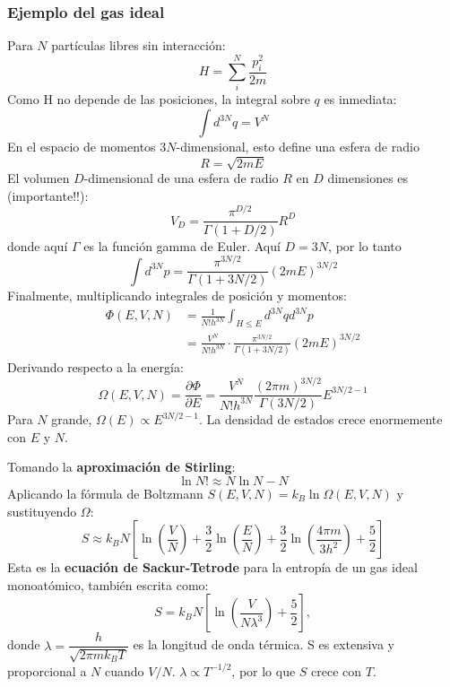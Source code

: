 \documentclass[]{article}
\numberwithin{equation}{section}
\newcommand{\0}{\textcolor{gray}{0}}
\begin{document}
\subsubsection{Ejemplo del gas ideal}
Para \(N\) partículas libres sin interacción:
\begin{equation*}
	H=\sum_{i}^{N}\frac{p_i^2}{2m}
\end{equation*}
Como H no depende de las posiciones, la integral sobre \(q\) es inmediata:
\begin{equation*}
	\int d^{3N}q = V^N
\end{equation*}
En el espacio de momentos \(3N\)-dimensional, esto define una esfera de radio
\begin{equation*}
	R = \sqrt{2mE}
\end{equation*}
El volumen \(D\)-dimensional de una esfera de radio \(R\) en \(D\) dimensiones es (importante!!):
\begin{equation}
	V_D = \frac{\pi^{D/2}}{\Gamma(1+D/2)}R^D
\end{equation}
donde aquí \(\Gamma\) es la función gamma de Euler. Aquí \(D = 3N\), por lo tanto
\begin{equation*}
	\int d^{3N}p = \frac{\pi^{3N/2}}{\Gamma(1+3N/2)}(2mE)^{3N/2}
\end{equation*}
Finalmente, multiplicando integrales de posición y momentos:
\begin{align*}
	\Phi(E,V,N) &= \frac{1}{N!h^{3N}}\int_{H\leq E} d^{3N}q d^{3N}p\\
	&= \frac{V^N}{N!h^{3N}}\cdot\frac{\pi^{3N/2}}{\Gamma(1+3N/2)}(2mE)^{3N/2}
\end{align*}
Derivando respecto a la energía:
\begin{equation*}
	\Omega(E,V,N) = \frac{\partial\Phi}{\partial E} = \frac{V^N}{N!h^{3N}}\frac{(2\pi m)^{3N/2}}{\Gamma(3N/2)}E^{3N/2 - 1}
\end{equation*}
Para \(N\) grande, \(\Omega(E)\propto E^{3N/2 - 1}\). La densidad de estados crece enormemente con  \(E\) y \(N\).

Tomando la \textbf{aproximación de Stirling}:
\begin{equation}
	\ln{N!} \approx N\ln{N} - N
	\label{stirling}
\end{equation}
Aplicando la fórmula de Boltzmann \(S(E,V,N) = k_B \ln{\Omega(E,V,N)}\) y sustituyendo \(\Omega\):
\begin{equation}
	S \approx k_B N\left[\ln\left(\frac{V}{N}\right) + \frac{3}{2}\ln\left(\frac{E}{N}\right) + \frac{3}{2}\ln\left(\frac{4\pi m}{3h^2}\right) + \frac{5}{2}\right]
	\label{eqn:S-T_completa}
\end{equation}
Esta es la \textbf{ecuación de Sackur-Tetrode} para la entropía de un gas ideal monoatómico, también escrita como:
\begin{equation}
	S = k_B N\left[\ln\left(\frac{V}{N\lambda^3} \right) + \frac{5}{2} \right],
	\label{eqn:S-T_reducida}
\end{equation}
donde \(\lambda = \dfrac{h}{\sqrt{2\pi m k_B T}}\) es la longitud de onda térmica.
S es extensiva y proporcional a \(N\) cuando \(V/N\). \(\lambda\propto T^{-1/2}\), por lo que \(S\) crece con \(T\).
\end{document}
